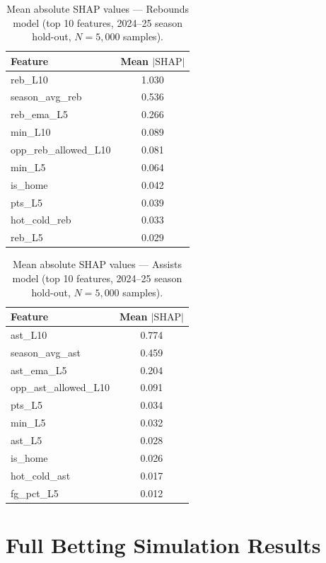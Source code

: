 \documentclass[12pt, letterpaper]{article}
\begin{document}
\begin{table}[H]
\centering
\caption{Mean absolute SHAP values --- Rebounds model (top 10 features,
         2024--25 season hold-out, $N=5{,}000$ samples).}
\label{tab:shap_reb}
\begin{tabular}{lc}
\toprule
\textbf{Feature} & \textbf{Mean $|\text{SHAP}|$} \\
\midrule
reb\_L10              & 1.030 \\
season\_avg\_reb      & 0.536 \\
reb\_ema\_L5          & 0.266 \\
min\_L10              & 0.089 \\
opp\_reb\_allowed\_L10 & 0.081 \\
min\_L5               & 0.064 \\
is\_home              & 0.042 \\
pts\_L5               & 0.039 \\
hot\_cold\_reb        & 0.033 \\
reb\_L5               & 0.029 \\
\bottomrule
\end{tabular}
\end{table}

\begin{table}[H]
\centering
\caption{Mean absolute SHAP values --- Assists model (top 10 features,
         2024--25 season hold-out, $N=5{,}000$ samples).}
\label{tab:shap_ast}
\begin{tabular}{lc}
\toprule
\textbf{Feature} & \textbf{Mean $|\text{SHAP}|$} \\
\midrule
ast\_L10              & 0.774 \\
season\_avg\_ast      & 0.459 \\
ast\_ema\_L5          & 0.204 \\
opp\_ast\_allowed\_L10 & 0.091 \\
pts\_L5               & 0.034 \\
min\_L5               & 0.032 \\
ast\_L5               & 0.028 \\
is\_home              & 0.026 \\
hot\_cold\_ast        & 0.017 \\
fg\_pct\_L5           & 0.012 \\
\bottomrule
\end{tabular}
\end{table}

\section{Full Betting Simulation Results}
\label{app:betting}
\end{document}
